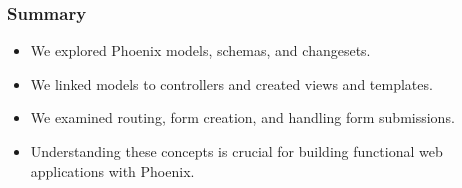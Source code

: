 \documentclass[aspectratio=169, table]{beamer}
\begin{document}
	\begin{frame}
		\frametitle{Summary}
		\begin{itemize}
			\item We explored Phoenix models, schemas, and changesets.
			\item We linked models to controllers and created views and templates.
			\item We examined routing, form creation, and handling form submissions.
			\item Understanding these concepts is crucial for building functional web applications with Phoenix.
		\end{itemize}
	\end{frame}
	
\end{document}
